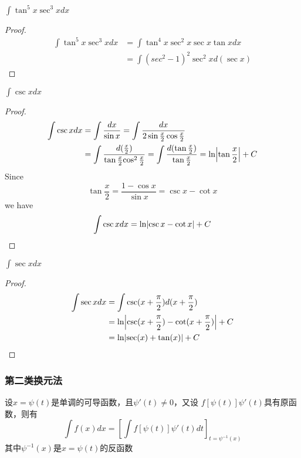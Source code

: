 \documentclass[11pt]{article}
\begin{document}
\begin{proposition}[]
\(\int\tan^5x\sec^3xdx\)
\end{proposition}

\begin{proof}
\begin{align*}
\int\tan^5x\sec^3xdx&=\int\tan^4x\sec^2x\sec x\tan xdx\\
&=\int(sec^2-1)^2\sec^2xd(\sec x)
\end{align*}
\end{proof}

\begin{proposition}[]
\(\int\csc xdx\)
\end{proposition}

\begin{proof}
\begin{align*}
\int\csc xdx&=\int\frac{dx}{\sin x}=\int\frac{dx}{2\sin\frac{x}{2}\cos\frac{x}{2}}\\
&=\int\frac{d(\frac{x}{2})}{\tan{\frac{x}{2}}{\cos^2\frac{x}{2}}}=
\int\frac{d(\tan\frac{x}{2})}{\tan\frac{x}{2}}=\ln\abs{\tan\frac{x}{2}}+C
\end{align*}
Since
\begin{equation*}
\tan\frac{x}{2}=\frac{1-\cos x}{\sin x}=\csc x-\cot x
\end{equation*}
we have
\begin{equation*}
\int\csc xdx=\ln\abs{\csc x-\cot x}+C
\end{equation*}
\end{proof}

\begin{proposition}[]
\(\int\sec xdx\)
\end{proposition}

\begin{proof}
\begin{align*}
\int\sec xdx&=\int\csc(x+\frac{\pi}{2})d(x+\frac{\pi}{2})\\
&=\ln\abs{\csc(x+\frac{\pi}{2})-\cot(x+\frac{\pi}{2})}+C\\
&=\ln\abs{\sec(x)+\tan(x)}+C
\end{align*}
\end{proof}
\subsubsection{第二类换元法}
\label{sec:org55c05b9}
\begin{theorem}[]
设\(x=\psi(t)\)是单调的可导函数，且\(\psi'(t)\neq0\)，又设
\(f[\psi(t)]\psi'(t)\)具有原函数，则有
\begin{equation*}
\int f(x)dx=\left[\int f[\psi(t)]\psi'(t)dt\right]_{t=\psi^{-1}(x)}
\end{equation*}
其中\(\psi^{-1}(x)\)是\(x=\psi(t)\)的反函数
\end{theorem}
\end{document}

